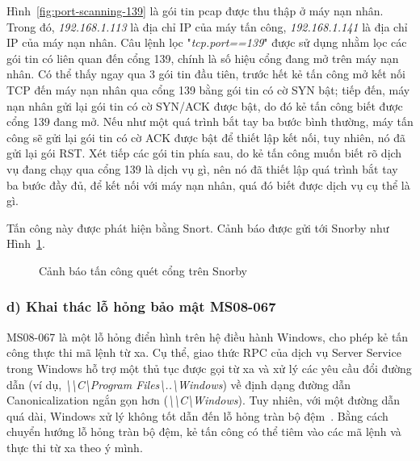 Hình~\ref{fig:port-scanning-139} là gói tin pcap được thu thập ở máy nạn nhân. Trong đó, \emph{192.168.1.113} là địa chỉ IP của máy tấn công, \emph{192.168.1.141} là địa chỉ IP của máy nạn nhân. Câu lệnh lọc "\emph{tcp.port==139}" được sử dụng nhằm lọc các gói tin có liên quan đến cổng 139, chính là số hiệu cổng đang mở trên máy nạn nhân. Có thể thấy ngay qua 3 gói tin đầu tiên, trước hết kẻ tấn công mở kết nối TCP đến máy nạn nhân qua cổng 139 bằng gói tin có cờ SYN bật; tiếp đến, máy nạn nhân gửi lại gói tin có cờ SYN/ACK được bật, do đó kẻ tấn công biết được cổng 139 đang mở. Nếu như một quá trình bắt tay ba bước bình thường, máy tấn công sẽ gửi lại gói tin có cờ ACK được bật để thiết lập kết nối, tuy nhiên, nó đã gửi lại gói RST. Xét tiếp các gói tin phía sau, do kẻ tấn công muốn biết rõ dịch vụ đang chạy qua cổng 139 là dịch vụ gì, nên nó đã thiết lập quá trình bắt tay ba bước đầy đủ, để kết nối với máy nạn nhân, quá đó biết được dịch vụ cụ thể là gì.

Tấn công này được phát hiện bằng Snort. Cảnh báo được gửi tới Snorby như Hình~\ref{fig:port-scanning-attack-snorby}.

\begin{figure}[H]
    \centering
    \caption{
        \label{fig:port-scanning-attack-snorby}
        Cảnh báo tấn công quét cổng trên Snorby}
\end{figure}

\subsubsection*{d) Khai thác lỗ hỏng bảo mật MS08-067}
MS08-067 là một lỗ hỏng điển hình trên hệ điều hành Windows, cho phép kẻ tấn công thực thi mã lệnh từ xa. Cụ thể, giao thức RPC của dịch vụ Server Service trong Windows hỗ trợ một thủ tục được gọi từ xa và xử lý các yêu cầu đổi đường dẫn (ví dụ, \emph{{\textbackslash \textbackslash}C{\textbackslash}Program Files{\textbackslash}..{\textbackslash}Windows}) về định dạng đường dẫn Canonicalization ngắn gọn hơn (\emph{{\textbackslash \textbackslash}C{\textbackslash}Windows}). Tuy nhiên, với một đường dẫn quá dài, Windows xử lý không tốt dẫn đến lỗ hỏng tràn bộ đệm~\cite{microsoft2008ms08067}. Bằng cách chuyển hướng lỗ hỏng tràn bộ đệm, kẻ tấn công có thể tiêm vào các mã lệnh và thực thi từ xa theo ý mình.


